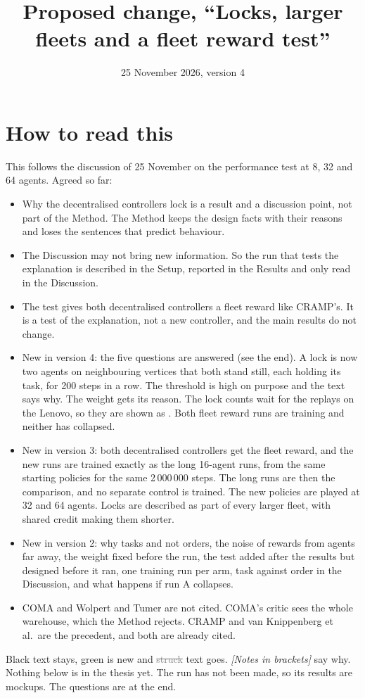 \documentclass[11pt,a4paper]{article}
\title{Proposed change, ``Locks, larger fleets and a fleet reward test''}
\date{25 November 2026, version 4}
\newcommand{\new}[1]{\textcolor{newc}{#1}}
\newcommand{\old}[1]{\textcolor{gray}{\sout{#1}}}
\newcommand{\note}[1]{{\small\itshape [#1]}}
\newcommand{\mockup}[1]{\fbox{\small mockup: #1}}
\begin{document}
\sloppy
\maketitle

\section*{How to read this}
This follows the discussion of 25 November on the performance test at 8, 32
and 64 agents. Agreed so far:
\begin{itemize}[nosep]
  \item Why the decentralised controllers lock is a result and a discussion
    point, not part of the Method. The Method keeps the design facts with
    their reasons and loses the sentences that predict behaviour.
  \item The Discussion may not bring new information. So the run that tests
    the explanation is described in the Setup, reported in the Results and
    only read in the Discussion.
  \item The test gives both decentralised controllers a fleet
    reward like CRAMP's. It is a test of the explanation, not a new
    controller, and the main results do not change.
  \item New in version 4: the five questions are answered (see the end). A
    lock is now two agents on neighbouring vertices that both stand still,
    each holding its task, for 200 steps in a row. The threshold is high on
    purpose and the text says why. The weight gets its reason. The lock
    counts wait for the replays on the Lenovo, so they are shown as
    \mockup{waiting}. Both fleet reward runs are training and neither has
    collapsed.
  \item New in version 3: both decentralised controllers get the fleet
    reward, and the new runs are trained exactly as the long 16-agent runs,
    from the same starting policies for the same 2\,000\,000 steps. The long
    runs are then the comparison, and no separate control is trained. The new
    policies are played at 32 and 64 agents. Locks are described as part of
    every larger fleet, with shared credit making them shorter.
  \item New in version 2: why tasks and not orders, the noise of rewards
    from agents far away, the weight fixed before the run, the test added after
    the results but designed before it ran, one training run per arm, task
    against order in the Discussion, and what happens if run A collapses.
  \item COMA and Wolpert and Tumer are not cited. COMA's critic sees the whole
    warehouse, which the Method rejects. CRAMP and van Knippenberg et al.\
    are the precedent, and both are already cited.
\end{itemize}
Black text stays, \new{green} is new and \old{struck} text goes.
\note{Notes in brackets} say why. Nothing below is in the thesis yet. The
run has not been made, so its results are mockups. The questions are at the
end.
\end{document}
